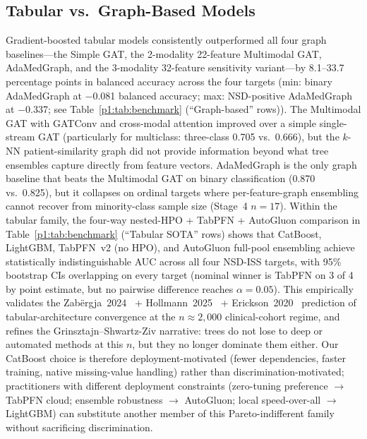 \documentclass[10pt,letterpaper]{article}
\begin{document}
\subsection*{Tabular vs.\ Graph-Based Models}
Gradient-boosted tabular models consistently outperformed all four graph baselines---the Simple GAT, the 2-modality 22-feature Multimodal GAT, AdaMedGraph, and the 3-modality 32-feature sensitivity variant---by 8.1--33.7 percentage points in balanced accuracy across the four targets (min: binary AdaMedGraph at $-$0.081 balanced accuracy; max: NSD-positive AdaMedGraph at $-$0.337; see Table~\ref{p1:tab:benchmark} (``Graph-based'' rows)). The Multimodal GAT with GATConv and cross-modal attention improved over a simple single-stream GAT (particularly for multiclass: three-class 0.705 vs.\ 0.666), but the $k$-NN patient-similarity graph did not provide information beyond what tree ensembles capture directly from feature vectors. AdaMedGraph is the only graph baseline that beats the Multimodal GAT on binary classification (0.870 vs.\ 0.825), but it collapses on ordinal targets where per-feature-graph ensembling cannot recover from minority-class sample size (Stage~4 $n{=}17$). Within the tabular family, the four-way nested-HPO + TabPFN + AutoGluon comparison in Table~\ref{p1:tab:benchmark} (``Tabular SOTA'' rows) shows that CatBoost, LightGBM, TabPFN~v2 (no HPO), and AutoGluon full-pool ensembling achieve statistically indistinguishable AUC across all four NSD-ISS targets, with 95\% bootstrap CIs overlapping on every target (nominal winner is TabPFN on 3 of 4 by point estimate, but no pairwise difference reaches $\alpha{=}0.05$). This empirically validates the Zab\"{e}rgja~2024~\cite{zabergja2024dltabular} + Hollmann~2025~\cite{hollmann2025tabpfn} + Erickson~2020~\cite{erickson2020autogluon} prediction of tabular-architecture convergence at the $n{\approx}2{,}000$ clinical-cohort regime, and refines the Grinsztajn--Shwartz-Ziv narrative: trees do not lose to deep or automated methods at this $n$, but they no longer dominate them either. Our CatBoost choice is therefore deployment-motivated (fewer dependencies, faster training, native missing-value handling) rather than discrimination-motivated; practitioners with different deployment constraints (zero-tuning preference $\to$ TabPFN cloud; ensemble robustness $\to$ AutoGluon; local speed-over-all $\to$ LightGBM) can substitute another member of this Pareto-indifferent family without sacrificing discrimination.
\end{document}
